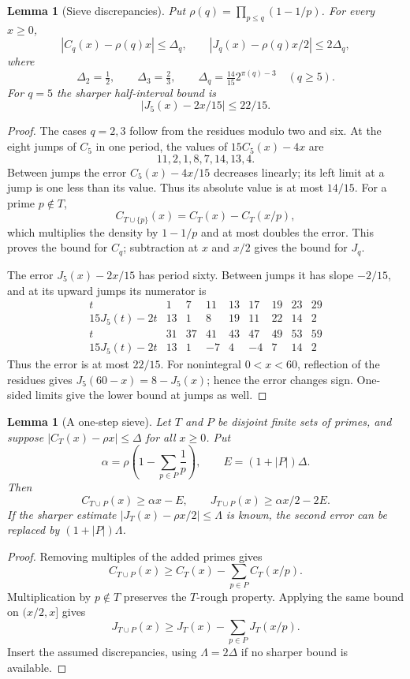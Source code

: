 \documentclass[11pt]{article}
\numberwithin{equation}{section}
\newtheorem{lemma}[theorem]{Lemma}
\theoremstyle{definition}\newtheorem{definition}[theorem]{Definition}
\theoremstyle{remark}\newtheorem{remark}[theorem]{Remark}
\begin{document}
\begin{lemma}[Sieve discrepancies]\label{arith:lem:rough-discrepancy}
\label{arith:lem:no-core-half-discrepancy}
Put $\rho(q)=\prod_{p\le q}(1-1/p)$. For every $x\ge0$,
\[
 |C_q(x)-\rho(q)x|\le\Delta_q,\qquad
 |J_q(x)-\rho(q)x/2|\le2\Delta_q,
\]
where
\[
 \Delta_2=\tfrac12,\qquad \Delta_3=\tfrac23,\qquad
 \Delta_q=\tfrac{14}{15}2^{\pi(q)-3}\quad(q\ge5).
\]
For $q=5$ the sharper half-interval bound is
\[
 |J_5(x)-2x/15|\le22/15.
\]
\end{lemma}
\begin{proof}
The cases $q=2,3$ follow from the residues modulo two and six.
At the eight jumps of $C_5$ in one period, the values of
$15C_5(x)-4x$ are
\[
 11,2,1,8,7,14,13,4.
\]
Between jumps the error $C_5(x)-4x/15$ decreases linearly; its
left limit at a jump is one less than its value. Thus its absolute
value is at most $14/15$.
For a prime $p\notin T$,
\[
 C_{T\cup\{p\}}(x)=C_T(x)-C_T(x/p),
\]
which multiplies the density by $1-1/p$ and at most doubles the
error. This proves the bound for $C_q$; subtraction at $x$ and
$x/2$ gives the bound for $J_q$.

The error $J_5(x)-2x/15$ has period sixty. Between jumps it has
slope $-2/15$, and at its upward jumps its numerator is
\[
\begin{array}{c|rrrrrrrr}
t&1&7&11&13&17&19&23&29\\\hline
15J_5(t)-2t&13&1&8&19&11&22&14&2\\[2pt]
t&31&37&41&43&47&49&53&59\\\hline
15J_5(t)-2t&13&1&-7&4&-4&7&14&2
\end{array}
\]
Thus the error is at most $22/15$. For nonintegral $0<x<60$,
reflection of the residues gives $J_5(60-x)=8-J_5(x)$; hence the
error changes sign. One-sided limits give the lower bound at
jumps as well.
\end{proof}

\begin{lemma}[A one-step sieve]\label{arith:lem:one-step-sieve}
Let $T$ and $P$ be disjoint finite sets of primes, and suppose
$|C_T(x)-\rho x|\le\Delta$ for all $x\ge0$. Put
\[
 \alpha=\rho\left(1-\sum_{p\in P}\frac1p\right),
 \qquad E=(1+|P|)\Delta.
\]
Then
\[
 C_{T\cup P}(x)\ge\alpha x-E,\qquad
 J_{T\cup P}(x)\ge\alpha x/2-2E.
\]
If the sharper estimate $|J_T(x)-\rho x/2|\le\Lambda$ is known,
the second error can be replaced by $(1+|P|)\Lambda$.
\end{lemma}
\begin{proof}
Removing multiples of the added primes gives
\[
 C_{T\cup P}(x)\ge C_T(x)-\sum_{p\in P}C_T(x/p).
\]
Multiplication by $p\notin T$ preserves the $T$-rough property.
Applying the same bound on $(x/2,x]$ gives
\[
 J_{T\cup P}(x)\ge J_T(x)-\sum_{p\in P}J_T(x/p).
\]
Insert the assumed discrepancies, using $\Lambda=2\Delta$ if no
sharper bound is available.
\end{proof}
\end{document}
